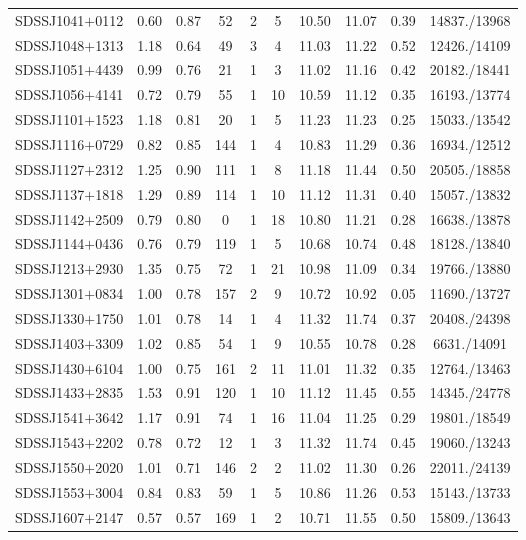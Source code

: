 \documentclass{emulateapj}
\begin{document}
\begin{table*}[htbp]
\begin{center}
\begin{tabular}{c c c c c c c c c c}
SDSSJ1041$+$0112 & 0.60 & 0.87 & 52 & 2 & 5 & 10.50 & 11.07 & 0.39 & 14837./13968 \\ 
SDSSJ1048$+$1313 & 1.18 & 0.64 & 49 & 3 & 4 & 11.03 & 11.22 & 0.52 & 12426./14109 \\ 
SDSSJ1051$+$4439 & 0.99 & 0.76 & 21 & 1 & 3 & 11.02 & 11.16 & 0.42 & 20182./18441 \\ 
SDSSJ1056$+$4141 & 0.72 & 0.79 & 55 & 1 & 10 & 10.59 & 11.12 & 0.35 & 16193./13774 \\ 
SDSSJ1101$+$1523 & 1.18 & 0.81 & 20 & 1 & 5 & 11.23 & 11.23 & 0.25 & 15033./13542 \\ 
SDSSJ1116$+$0729 & 0.82 & 0.85 & 144 & 1 & 4 & 10.83 & 11.29 & 0.36 & 16934./12512 \\ 
SDSSJ1127$+$2312 & 1.25 & 0.90 & 111 & 1 & 8 & 11.18 & 11.44 & 0.50 & 20505./18858 \\ 
SDSSJ1137$+$1818 & 1.29 & 0.89 & 114 & 1 & 10 & 11.12 & 11.31 & 0.40 & 15057./13832 \\ 
SDSSJ1142$+$2509 & 0.79 & 0.80 & 0 & 1 & 18 & 10.80 & 11.21 & 0.28 & 16638./13878 \\ 
SDSSJ1144$+$0436 & 0.76 & 0.79 & 119 & 1 & 5 & 10.68 & 10.74 & 0.48 & 18128./13840 \\ 
SDSSJ1213$+$2930 & 1.35 & 0.75 & 72 & 1 & 21 & 10.98 & 11.09 & 0.34 & 19766./13880 \\ 
SDSSJ1301$+$0834 & 1.00 & 0.78 & 157 & 2 & 9 & 10.72 & 10.92 & 0.05 & 11690./13727 \\ 
SDSSJ1330$+$1750 & 1.01 & 0.78 & 14 & 1 & 4 & 11.32 & 11.74 & 0.37 & 20408./24398 \\ 
SDSSJ1403$+$3309 & 1.02 & 0.85 & 54 & 1 & 9 & 10.55 & 10.78 & 0.28 & 6631./14091 \\ 
SDSSJ1430$+$6104 & 1.00 & 0.75 & 161 & 2 & 11 & 11.01 & 11.32 & 0.35 & 12764./13463 \\ 
SDSSJ1433$+$2835 & 1.53 & 0.91 & 120 & 1 & 10 & 11.12 & 11.45 & 0.55 & 14345./24778 \\ 
SDSSJ1541$+$3642 & 1.17 & 0.91 & 74 & 1 & 16 & 11.04 & 11.25 & 0.29 & 19801./18549 \\ 
SDSSJ1543$+$2202 & 0.78 & 0.72 & 12 & 1 & 3 & 11.32 & 11.74 & 0.45 & 19060./13243 \\ 
SDSSJ1550$+$2020 & 1.01 & 0.71 & 146 & 2 & 2 & 11.02 & 11.30 & 0.26 & 22011./24139 \\ 
SDSSJ1553$+$3004 & 0.84 & 0.83 & 59 & 1 & 5 & 10.86 & 11.26 & 0.53 & 15143./13733 \\ 
SDSSJ1607$+$2147 & 0.57 & 0.57 & 169 & 1 & 2 & 10.71 & 11.55 & 0.50 & 15809./13643 \\ 

\end{tabular}
\end{center}
\end{table*}
\end{document}
